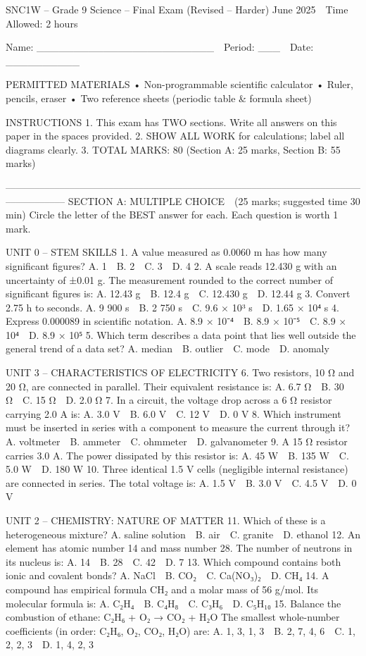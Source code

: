 SNC1W – Grade 9 Science – Final Exam (Revised – Harder)    
June 2025  Time Allowed: 2 hours    
  
Name: ________________________  Period: ___  Date: __________    
  
PERMITTED MATERIALS    
• Non-programmable scientific calculator    
• Ruler, pencils, eraser    
• Two reference sheets (periodic table & formula sheet)    
  
INSTRUCTIONS    
1. This exam has TWO sections. Write all answers on this paper in the spaces provided.    
2. SHOW ALL WORK for calculations; label all diagrams clearly.    
3. TOTAL MARKS: 80 (Section A: 25 marks, Section B: 55 marks)    
  
––––––––––––––––––––––––––––––––––––––––––––––––––––––––––––––––––––––––––––––––––––    
SECTION A: MULTIPLE CHOICE (25 marks; suggested time 30 min)    
Circle the letter of the BEST answer for each. Each question is worth 1 mark.    
  
UNIT 0 – STEM SKILLS    
1. A value measured as 0.0060 m has how many significant figures?    
   A. 1 B. 2 C. 3 D. 4    
2. A scale reads 12.430 g with an uncertainty of ±0.01 g. The measurement rounded to the correct number of significant figures is:    
   A. 12.43 g B. 12.4 g C. 12.430 g D. 12.44 g    
3. Convert 2.75 h to seconds.    
   A. 9 900 s B. 2 750 s C. 9.6 × 10³ s D. 1.65 × 10⁴ s    
4. Express 0.000089 in scientific notation.    
   A. 8.9 × 10⁻⁴ B. 8.9 × 10⁻⁵ C. 8.9 × 10⁴ D. 8.9 × 10⁵    
5. Which term describes a data point that lies well outside the general trend of a data set?    
   A. median B. outlier C. mode D. anomaly    
  
UNIT 3 – CHARACTERISTICS OF ELECTRICITY    
6. Two resistors, 10 Ω and 20 Ω, are connected in parallel. Their equivalent resistance is:    
   A. 6.7 Ω B. 30 Ω C. 15 Ω D. 2.0 Ω    
7. In a circuit, the voltage drop across a 6 Ω resistor carrying 2.0 A is:    
   A. 3.0 V B. 6.0 V C. 12 V D. 0 V    
8. Which instrument must be inserted in series with a component to measure the current through it?    
   A. voltmeter B. ammeter C. ohmmeter D. galvanometer    
9. A 15 Ω resistor carries 3.0 A. The power dissipated by this resistor is:    
   A. 45 W B. 135 W C. 5.0 W D. 180 W    
10. Three identical 1.5 V cells (negligible internal resistance) are connected in series. The total voltage is:    
   A. 1.5 V B. 3.0 V C. 4.5 V D. 0 V    
  
UNIT 2 – CHEMISTRY: NATURE OF MATTER    
11. Which of these is a heterogeneous mixture?    
   A. saline solution B. air C. granite D. ethanol    
12. An element has atomic number 14 and mass number 28. The number of neutrons in its nucleus is:    
   A. 14 B. 28 C. 42 D. 7    
13. Which compound contains both ionic and covalent bonds?    
   A. NaCl B. CO₂ C. Ca(NO₃)₂ D. CH₄    
14. A compound has empirical formula CH₂ and a molar mass of 56 g/mol. Its molecular formula is:    
   A. C₂H₄ B. C₄H₈ C. C₃H₆ D. C₅H₁₀    
15. Balance the combustion of ethane:    
    C₂H₆ + O₂ → CO₂ + H₂O    
   The smallest whole-number coefficients (in order: C₂H₆, O₂, CO₂, H₂O) are:    
   A. 1, 3, 1, 3 B. 2, 7, 4, 6 C. 1, 2, 2, 3 D. 1, 4, 2, 3    
  
